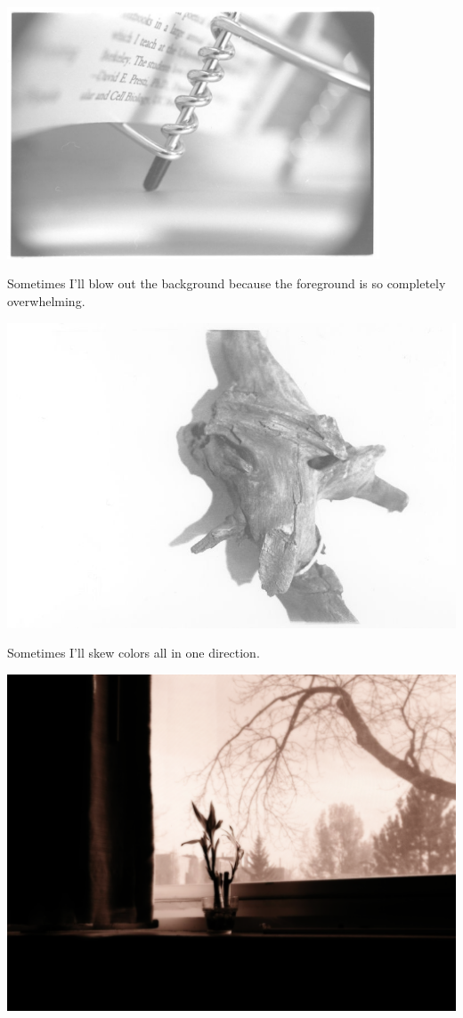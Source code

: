\begin{paracol}{2}
\begin{leftcolumn}
\noindent\includegraphics[width=4.35in]{../static/color/bw2.jpg}

\newpage

Sometimes I'll blow out the background because the foreground is so completely overwhelming.
\end{leftcolumn}
\end{paracol}
\vfill

\noindent\includegraphics[width=7in]{../static/color/bw3.jpg}

\vfill
\newpage

Sometimes I'll skew colors all in one direction.
\vfill

\noindent\includegraphics[width=7in]{../static/color/window_view.png}

